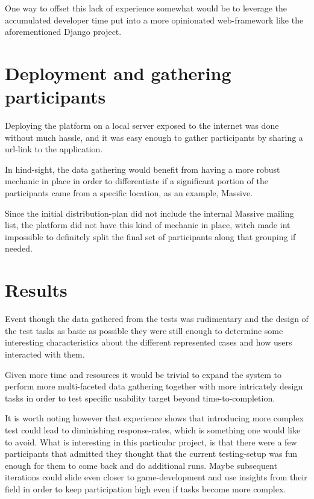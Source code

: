   One way to offset this lack of experience somewhat would be to leverage the
  accumulated developer time put into a more opinionated web-framework like the
  aforementioned Django\cite{citeDjangoHomepage} project.

\section{Deployment and gathering participants}

  Deploying the platform on a local server exposed to the internet was done
  without much hassle, and it was easy enough to gather participants by
  sharing a url-link to the application.

  In hind-sight, the data gathering would benefit from having a more robust
  mechanic in place in order to differentiate if a significant portion of the
  participants came from a specific location, as an example, Massive.

  Since the initial distribution-plan did not include the internal Massive
  mailing list, the platform did not have this kind of mechanic in place, witch
  made int impossible to definitely split the final set of participants along
  that grouping if needed.

\section{Results}

  Event though the data gathered from the tests was rudimentary and the
  design of the test tasks as basic as possible they were still enough to
  determine some interesting characteristics about the different represented
  cases and how users interacted with them.

  Given more time and resources it would be trivial to expand the system to
  perform more multi-faceted data gathering together with more intricately
  design tasks in order to test specific usability target beyond
	time-to-completion.

	It is worth noting however that experience shows that introducing more
	complex test could lead to diminishing response-rates, which is something one
	would like to avoid. What is interesting in this particular project, is that
	there were a few participants that admitted they thought that the current
	testing-setup was fun enough for them to come back and do additional runs.
	Maybe subsequent iterations could slide even closer to game-development and
	use insights from their field in order to keep participation high even if
	tasks become more complex.

